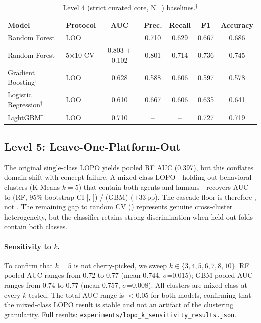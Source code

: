 \documentclass[10pt]{article}
\begin{document}
\begin{table}[h]
\centering
\small
\caption{Level 4 (strict curated core, N=\datasetStrictCoreN{}) baselines.$^\dagger$}
\label{tab:level4}
\begin{tabular}{llccccc}
\toprule
Model & Protocol & AUC & Prec. & Recall & F1 & Accuracy \\
\midrule
Random Forest & LOO & \cascadeLevelStrictCoreAuc{} & 0.710 & 0.629 & 0.667 & 0.686 \\
Random Forest & 5$\times$10-CV & 0.803 $\pm$ 0.102 & 0.801 & 0.714 & 0.736 & 0.745 \\
Gradient Boosting$^\dagger$ & LOO & 0.628 & 0.588 & 0.606 & 0.597 & 0.578 \\
Logistic Regression$^\dagger$ & LOO & 0.610 & 0.667 & 0.606 & 0.635 & 0.641 \\
LightGBM$^\dagger$ & LOO & 0.710 & -- & -- & 0.727 & 0.719 \\
\bottomrule
\end{tabular}

\smallskip
{}
\end{table}

\subsection{Level 5: Leave-One-Platform-Out}

The original single-class LOPO yields pooled RF AUC \lopoRfPooledAuc{} (0.397), but this conflates domain shift with concept failure. A mixed-class LOPO---holding out behavioral clusters (K-Means $k{=}5$) that contain both agents and humans---recovers AUC to \textbf{\mixedClassLopoRfAuc{}} (RF, 95\% bootstrap CI [\bootstrapLevelMixedRfAucCiLo{}, \bootstrapLevelMixedRfAucCiHi{}]) / \mixedClassLopoGbmAuc{} (GBM) ($+$33\,pp). The cascade floor is therefore \mixedClassLopoRfAuc{}, not \lopoRfPooledAuc{}. The remaining gap to random CV (\randomCvRfAuc{}) represents genuine cross-cluster heterogeneity, but the classifier retains strong discrimination when held-out folds contain both classes.

\paragraph{Sensitivity to $k$.} To confirm that $k{=}5$ is not cherry-picked, we sweep $k \in \{3,4,5,6,7,8,10\}$. RF pooled AUC ranges from 0.72 to 0.77 (mean 0.744, $\sigma$=0.015); GBM pooled AUC ranges from 0.74 to 0.77 (mean 0.757, $\sigma$=0.008). All clusters are mixed-class at every $k$ tested. The total AUC range is $<$0.05 for both models, confirming that the mixed-class LOPO result is stable and not an artifact of the clustering granularity. Full results: \texttt{experiments/lopo\_k\_sensitivity\_results.json}.
\end{document}
